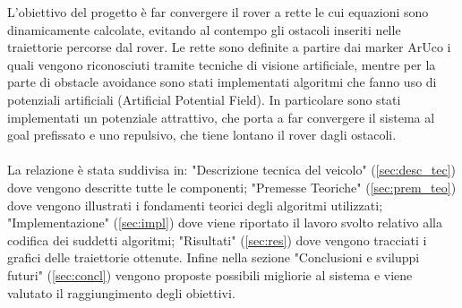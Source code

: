 L'obiettivo del progetto è far convergere il rover a rette le cui equazioni sono dinamicamente calcolate, evitando al contempo gli ostacoli inseriti nelle traiettorie percorse dal rover.  Le rette sono definite a  partire dai marker ArUco i quali vengono riconosciuti tramite tecniche di visione artificiale, mentre per la parte di obstacle avoidance sono stati implementati algoritmi che fanno uso di potenziali artificiali (Artificial Potential Field). In particolare sono stati implementati un potenziale attrattivo, che porta a far convergere il sistema al goal prefissato e uno repulsivo, che tiene lontano il rover dagli ostacoli.\\ \\
La relazione è stata suddivisa in: "Descrizione tecnica del veicolo" (\autoref{sec:desc_tec}) dove vengono descritte tutte le componenti; "Premesse Teoriche" (\autoref{sec:prem_teo}) dove vengono illustrati i fondamenti teorici degli algoritmi utilizzati; "Implementazione" (\autoref{sec:impl}) dove viene riportato il lavoro svolto relativo alla codifica dei suddetti algoritmi; "Risultati" (\autoref{sec:res}) dove vengono tracciati i grafici delle traiettorie ottenute. Infine nella sezione "Conclusioni e sviluppi futuri" (\autoref{sec:concl}) vengono proposte possibili migliorie al sistema e viene valutato il raggiungimento degli obiettivi.
